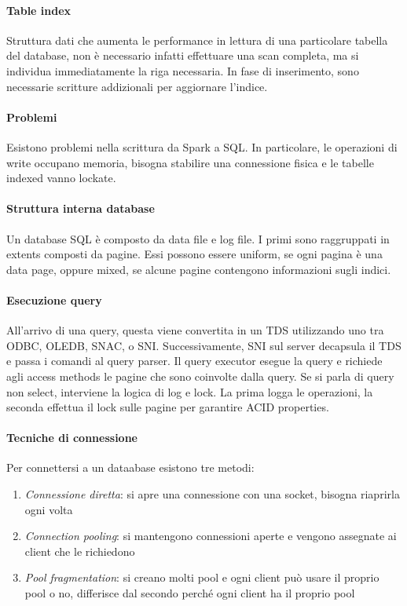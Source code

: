 \paragraph{Table index}
Struttura dati che aumenta le performance in lettura di una particolare tabella del 
database, non è necessario infatti effettuare una scan completa, ma si individua 
immediatamente la riga necessaria.
In fase di inserimento, sono necessarie scritture addizionali per aggiornare l'indice.

\paragraph{Problemi}
Esistono problemi nella scrittura da Spark a SQL. In particolare, le operazioni di 
write occupano memoria, bisogna stabilire una connessione fisica e le tabelle indexed 
vanno lockate.

\paragraph{Struttura interna database}
Un database SQL è composto da data file e log file. I primi sono raggruppati in extents 
composti da pagine. Essi possono essere uniform, se ogni pagina è una data page, oppure 
mixed, se alcune pagine contengono informazioni sugli indici.

\paragraph{Esecuzione query}
All'arrivo di una query, questa viene convertita in un TDS utilizzando uno tra ODBC, 
OLEDB, SNAC, o SNI.
Successivamente, SNI sul server decapsula il TDS e passa i comandi al query parser.
Il query executor esegue la query e richiede agli access methods le pagine che sono 
coinvolte dalla query. Se si parla di query non select, interviene la logica di log e lock.
La prima logga le operazioni, la seconda effettua il lock sulle pagine per garantire ACID properties.

\paragraph{Tecniche di connessione}
Per connettersi a un dataabase esistono tre metodi:
\begin{enumerate}
    \item \emph{Connessione diretta}: si apre una connessione con una socket, bisogna 
    riaprirla ogni volta
    \item \emph{Connection pooling}: si mantengono connessioni aperte e vengono assegnate 
    ai client che le richiedono
    \item \emph{Pool fragmentation}: si creano molti pool e ogni client può usare il proprio
     pool o no, differisce dal secondo perché ogni client ha il proprio pool
\end{enumerate}

